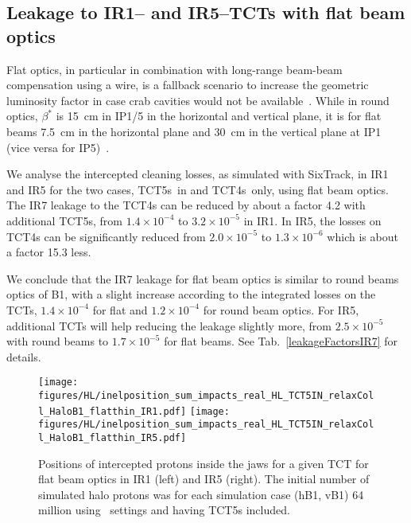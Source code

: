 
\subsection{Leakage to IR1-- and IR5--TCTs with flat beam optics}

Flat optics, in particular in combination with long-range beam-beam compensation using a wire, is a fallback scenario to increase the geometric luminosity factor in case crab cavities would not be available~\cite{flatRef}. While in round optics, $\beta^*$ is 15~cm in IP1/5 in the horizontal and vertical plane, it is for flat beams 7.5~cm in the horizontal plane and 30~cm in the vertical plane at IP1 (vice versa for IP5)~\cite{opticsWebRef}. 

We analyse the intercepted cleaning losses, as simulated with SixTrack, in IR1 and IR5 for the two cases, TCT5s~in and TCT4s~only, using flat beam optics. The IR7 leakage to the TCT4s can be reduced by about a factor 4.2 with additional TCT5s, from $1.4 \times 10^{-4}$ to $3.2 \times 10^{-5}$ in IR1. In IR5, the losses on TCT4s can be significantly reduced from $2.0 \times 10^{-5}$ to $1.3 \times 10^{-6}$ which is about a factor 15.3 less. 

We conclude that the IR7 leakage for flat beam optics is similar to round beams optics of B1, with a slight increase according to the integrated losses on the TCTs, $1.4 \times 10^{-4}$ for flat and $1.2 \times 10^{-4}$ for round beam optics. For IR5, additional TCTs will help reducing the leakage slightly more, from $2.5 \times 10^{-5}$ with round beams to $1.7 \times 10^{-5}$ for flat beams. See Tab.~\ref{leakageFactorsIR7} for details.


\begin{figure}%
\begin{center}
  \texttt{[image: figures/HL/inelposition\_sum\_impacts\_real\_HL\_TCT5IN\_relaxColl\_HaloB1\_flatthin\_IR1.pdf]}
  \texttt{[image: figures/HL/inelposition\_sum\_impacts\_real\_HL\_TCT5IN\_relaxColl\_HaloB1\_flatthin\_IR5.pdf]}
\end{center}
 \caption{Positions of intercepted protons inside the jaws for a given TCT for flat beam optics in IR1 (left) and IR5 (right). The initial number of simulated halo protons was for each simulation case (hB1, vB1) 64 million using \twosigmaret~settings and having TCT5s included.
   \label{fig:inelflat}}
\end{figure}
